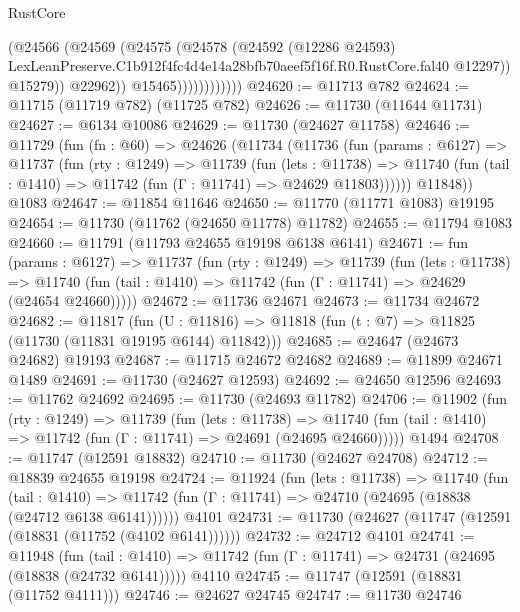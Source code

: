\begin{lexlean}{RustCore}
\begin{coremodule}
                              (@24566
                                (@24569
                                  (@24575
                                    (@24578
                                      (@24592
                                        (@12286 @24593)
                                        LexLeanPreserve.C1b912f4fc4d4e14a28bfb70aeef5f16f.R0.RustCore.fal40
                                        @12297))
                                    @15279))
                                @22962))
                            @15465))))))))))))
@24620 := @11713 @782
@24624 := @11715 (@11719 @782) (@11725 @782)
@24626 := @11730 (@11644 @11731)
@24627 := @6134 @10086
@24629 := @11730 (@24627 @11758)
@24646 := @11729
    (fun (fn : @60) =>
    @24626
      (@11734
        (@11736
          (fun (params : @6127) =>
          @11737
            (fun (rty : @1249) =>
            @11739
              (fun (lets : @11738) =>
              @11740 (fun (tail : @1410) => @11742 (fun (Γ : @11741) => @24629 @11803))))))
        @11848))
    @1083
@24647 := @11854 @11646
@24650 := @11770 (@11771 @1083) @19195
@24654 := @11730 (@11762 (@24650 @11778) @11782)
@24655 := @11794 @1083
@24660 := @11791 (@11793 @24655 @19198 @6138 @6141)
@24671 := fun (params : @6127) =>
  @11737
    (fun (rty : @1249) =>
    @11739
      (fun (lets : @11738) =>
      @11740 (fun (tail : @1410) => @11742 (fun (Γ : @11741) => @24629 (@24654 @24660)))))
@24672 := @11736 @24671
@24673 := @11734 @24672
@24682 := @11817
    (fun (U : @11816) => @11818 (fun (t : @7) => @11825 (@11730 (@11831 @19195 @6144) @11842)))
@24685 := @24647 (@24673 @24682) @19193
@24687 := @11715 @24672 @24682
@24689 := @11899 @24671 @1489
@24691 := @11730 (@24627 @12593)
@24692 := @24650 @12596
@24693 := @11762 @24692
@24695 := @11730 (@24693 @11782)
@24706 := @11902
    (fun (rty : @1249) =>
    @11739
      (fun (lets : @11738) =>
      @11740 (fun (tail : @1410) => @11742 (fun (Γ : @11741) => @24691 (@24695 @24660)))))
    @1494
@24708 := @11747 (@12591 @18832)
@24710 := @11730 (@24627 @24708)
@24712 := @18839 @24655 @19198
@24724 := @11924
    (fun (lets : @11738) =>
    @11740
      (fun (tail : @1410) =>
      @11742 (fun (Γ : @11741) => @24710 (@24695 (@18838 (@24712 @6138 @6141))))))
    @4101
@24731 := @11730 (@24627 (@11747 (@12591 (@18831 (@11752 (@4102 @6141))))))
@24732 := @24712 @4101
@24741 := @11948
    (fun (tail : @1410) => @11742 (fun (Γ : @11741) => @24731 (@24695 (@18838 (@24732 @6141)))))
    @4110
@24745 := @11747 (@12591 (@18831 (@11752 @4111)))
@24746 := @24627 @24745
@24747 := @11730 @24746

\end{coremodule}
\end{lexlean}
